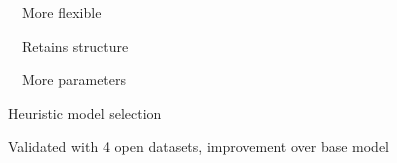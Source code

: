 \documentclass{kul-ulille-beamer}
\begin{document}
\begin{frame}
\begin{minipage}[t]{.55\textwidth}
    \begin{minipage}[t]{.5\textwidth}
      \small
      \posi\ \ More flexible
      \smallskip

      \posi\ \ Retains structure
      \smallskip

      {\tiny\cite{VanDenKerchovesubmitted}}
    \end{minipage}\hfill%
    \begin{minipage}[t]{.5\textwidth}
      \small\raggedright
      \nega\ \ More parameters
      \smallskip

      \ergo Heuristic model selection
      \smallskip

      Validated with 4 open datasets, improvement over base model
    \end{minipage}
  \end{minipage}

\end{frame}



\end{document}
